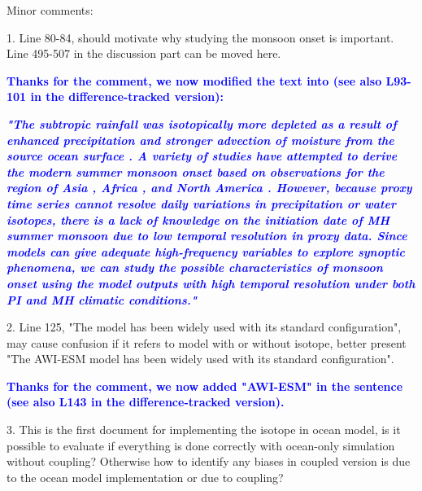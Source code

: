 \documentclass[gmd, manuscript]{copernicus}
\begin{document}
  \medskip
  
Minor comments:

 \medskip
 
1. Line 80-84, should motivate why studying the monsoon onset is important. Line 495-507 in the discussion part can be moved here.

\medskip

\textcolor{blue}{\textbf{Thanks for the comment, we now modified the text into (see also L93-101 in the difference-tracked version):}}

\textcolor{blue}{\textbf{\textit{"The subtropic rainfall was  isotopically more depleted \citep{herold2009eemian,cauquoin2019water,gierz2017simulating} as a result of enhanced precipitation and stronger advection of moisture from the source ocean surface \citep{herold2009eemian}. A variety of studies have attempted to derive the modern summer monsoon onset based on observations for the region of Asia \citep{nguyen2014climatological,moron2014interannual,joseph2006summer}, Africa  \citep{sultan2003west,fitzpatrick2015west,dunning2016onset}, and North America \citep{bombardi2020detection}. However, because proxy time series cannot resolve daily variations in precipitation or water isotopes,  there is a lack of knowledge on the initiation date of MH summer monsoon due to low temporal resolution in proxy data. Since models can give adequate high-frequency variables to explore synoptic phenomena, we can study the possible characteristics of monsoon onset using the model outputs with high temporal resolution under both PI and MH climatic conditions."}}}

\medskip


2. Line 125, "The model has been widely used with its standard configuration", may cause confusion if it refers to model with or without isotope, better present "The AWI-ESM model has been widely used with its standard configuration".

\medskip

\textcolor{blue}{\textbf{Thanks for the comment, we now added "AWI-ESM" in the sentence (see also L143 in the difference-tracked version).}}

\medskip

3. This is the first document for implementing the isotope in ocean model, is it possible to evaluate if everything is done correctly with ocean-only simulation without coupling? Otherwise how to identify any biases in coupled version is due to the ocean model implementation or due to coupling?
\end{document}
